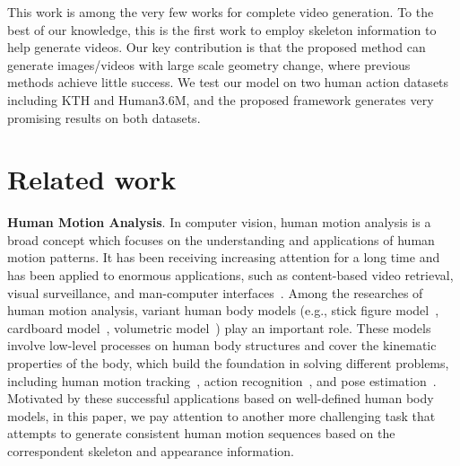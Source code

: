 \documentclass[journal]{IEEEtran}
\begin{document}
This work is among the very few works for complete video generation. To the best of our knowledge, this is the first work to employ skeleton information to help generate videos. Our key contribution is that the proposed method can generate images/videos with large scale geometry change, where previous methods achieve little success. We test our model on two human action datasets including KTH and Human3.6M, and the proposed framework generates very promising results on both datasets.

\section{Related work}
\textbf{Human Motion Analysis}. In computer vision, human motion analysis is a broad concept which focuses on the understanding and applications of human motion patterns. It has been receiving increasing attention for a long time and has been applied to enormous applications, such as content-based video retrieval, visual surveillance, and man-computer interfaces~\cite{poppe2007vision,aggarwal1997human,ji2010advances}. Among the researches of human motion analysis, variant human body models (e.g., stick figure model~\cite{ju1996cardboard,howe1999bayesian}, cardboard model~\cite{rashid1980towards},  volumetric model~\cite{kehl2006markerless}) play an important role. These models involve low-level processes on human body structures and cover the kinematic properties of the body, which build the foundation in solving different problems, including human motion tracking~\cite{huang2002model,ong2006viewpoint,mikic2003human}, action recognition~\cite{du2015hierarchical,papadopoulos2014real,grushin2013robust,gong2014structured}, and pose estimation~\cite{andriluka2009pictorial,andriluka20142d,toshev2014deeppose}. Motivated by these successful applications based on well-defined human body models, in this paper, we pay attention to another more challenging task that attempts to generate consistent human motion sequences based on the correspondent skeleton and appearance information.
\end{document}
